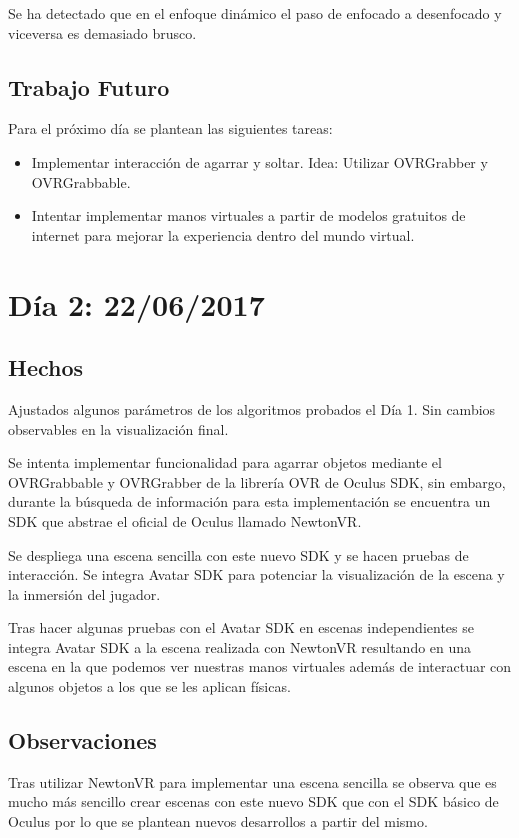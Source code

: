 \documentclass[12pt,a4paper]{article}
\begin{document}
Se ha detectado que en el enfoque dinámico el paso de enfocado a desenfocado y viceversa es demasiado brusco.

\subsection{Trabajo Futuro}

Para el próximo día se plantean las siguientes tareas:
\begin{itemize}
\item Implementar interacción de agarrar y soltar. Idea: Utilizar OVRGrabber y OVRGrabbable.
\item Intentar implementar manos virtuales a partir de modelos gratuitos de internet para mejorar la experiencia dentro del mundo virtual.
\end{itemize}

\section{Día 2: 22/06/2017}

\subsection{Hechos}

Ajustados algunos parámetros de los algoritmos probados el Día 1. Sin cambios observables en la visualización final.

Se intenta implementar funcionalidad para agarrar objetos mediante el OVRGrabbable y OVRGrabber de la librería OVR de Oculus SDK, sin embargo, durante la búsqueda de información para esta implementación se encuentra un SDK que abstrae el oficial de Oculus llamado NewtonVR.

Se despliega una escena sencilla con este nuevo SDK y se hacen pruebas de interacción.
Se integra Avatar SDK para potenciar la visualización de la escena y la inmersión del jugador.

Tras hacer algunas pruebas con el Avatar SDK en escenas independientes se integra Avatar SDK a la escena realizada con NewtonVR resultando en una escena en la que podemos ver nuestras manos virtuales además de interactuar con algunos objetos a los que se les aplican físicas.

\subsection{Observaciones}

Tras utilizar NewtonVR para implementar una escena sencilla se observa que es mucho más sencillo crear escenas con este nuevo SDK que con el SDK básico de Oculus por lo que se plantean nuevos desarrollos a partir del mismo.
\end{document}
